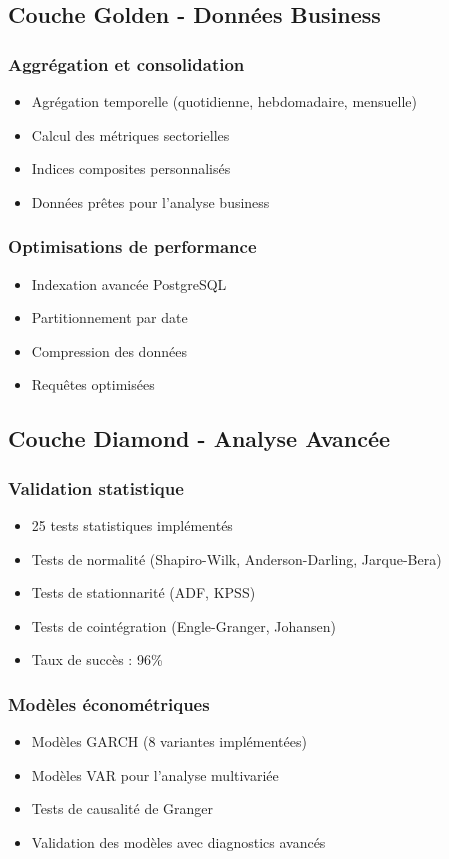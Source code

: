 \documentclass[12pt,a4paper]{article}
\begin{document}
\subsection{Couche Golden - Données Business}
\subsubsection{Aggrégation et consolidation}
\begin{itemize}
    \item Agrégation temporelle (quotidienne, hebdomadaire, mensuelle)
    \item Calcul des métriques sectorielles
    \item Indices composites personnalisés
    \item Données prêtes pour l'analyse business
\end{itemize}

\subsubsection{Optimisations de performance}
\begin{itemize}
    \item Indexation avancée PostgreSQL
    \item Partitionnement par date
    \item Compression des données
    \item Requêtes optimisées
\end{itemize}

\subsection{Couche Diamond - Analyse Avancée}
\subsubsection{Validation statistique}
\begin{itemize}
    \item 25 tests statistiques implémentés
    \item Tests de normalité (Shapiro-Wilk, Anderson-Darling, Jarque-Bera)
    \item Tests de stationnarité (ADF, KPSS)
    \item Tests de cointégration (Engle-Granger, Johansen)
    \item Taux de succès : 96\%
\end{itemize}

\subsubsection{Modèles économétriques}
\begin{itemize}
    \item Modèles GARCH (8 variantes implémentées)
    \item Modèles VAR pour l'analyse multivariée
    \item Tests de causalité de Granger
    \item Validation des modèles avec diagnostics avancés
\end{itemize}
\end{document}
